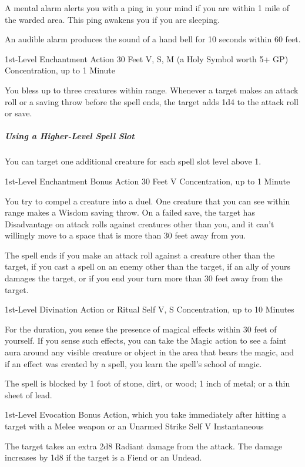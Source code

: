 \documentclass[letterpaper,openany,oneside,twocolumn]{book}
\begin{document}
A mental alarm alerts you with a ping in your mind if you are within 1 mile of the warded area. This ping awakens you if you are sleeping.

An audible alarm produces the sound of a hand bell for 10 seconds within 60 feet.

	{1st-Level Enchantment}
	{Action}
	{30 Feet}
	{V, S, M (a Holy Symbol worth 5+ GP)}
	{Concentration, up to 1 Minute}

You bless up to three creatures within range. Whenever a target makes an attack roll or a saving throw before the spell ends, the target adds 1d4 to the attack roll or save.

\subparagraph*{Using a Higher-Level Spell Slot} You can target one additional creature for each spell slot level above 1.

	{1st-Level Enchantment}
	{Bonus Action}
	{30 Feet}
	{V}
	{Concentration, up to 1 Minute}

You try to compel a creature into a duel. One creature that you can see within range makes a Wisdom saving throw. On a failed save, the target has Disadvantage on attack rolls against creatures other than you, and it can't willingly move to a space that is more than 30 feet away from you.

The spell ends if you make an attack roll against a creature other than the target, if you cast a spell on an enemy other than the target, if an ally of yours damages the target, or if you end your turn more than 30 feet away from the target.

	{1st-Level Divination}
	{Action or Ritual}
	{Self}
	{V, S}
	{Concentration, up to 10 Minutes}

For the duration, you sense the presence of magical effects within 30 feet of yourself. If you sense such effects, you can take the Magic action to see a faint aura around any visible creature or object in the area that bears the magic, and if an effect was created by a spell, you learn the spell's school of magic.

The spell is blocked by 1 foot of stone, dirt, or wood; 1 inch of metal; or a thin sheet of lead.

	{1st-Level Evocation}
	{Bonus Action, which you take immediately after hitting a target with a Melee weapon or an Unarmed Strike}
	{Self}
	{V}
	{Instantaneous}

The target takes an extra 2d8 Radiant damage from the attack. The damage increases by 1d8 if the target is a Fiend or an Undead.
\end{document}
